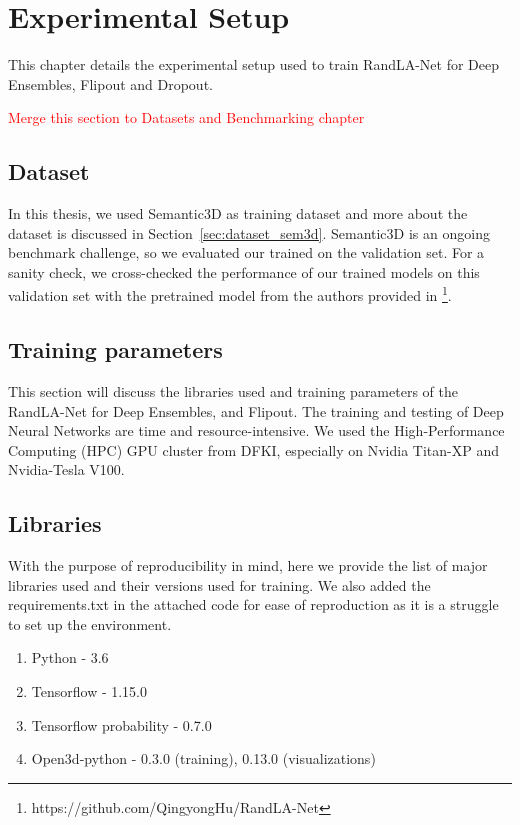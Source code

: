 

    \chapter{Experimental Setup}
    This chapter details the experimental setup used to train RandLA-Net for Deep Ensembles, Flipout and Dropout.


    \textcolor{red}{Merge this section to Datasets and Benchmarking chapter}
    \section{Dataset}
    In this thesis, we used Semantic3D as training dataset and more about the dataset is discussed in Section~\ref{sec:dataset_sem3d}.
    Semantic3D is an ongoing benchmark challenge, so we evaluated our trained on the validation set.
    For a sanity check, we cross-checked the performance of our trained models on this validation set with the pretrained model from the authors provided in \footnote[1]{https://github.com/QingyongHu/RandLA-Net}.

    \section{Training parameters}
    This section will discuss the libraries used and training parameters of the RandLA-Net for Deep Ensembles, and Flipout.    The training and testing of Deep Neural Networks are time and resource-intensive.
    We used the High-Performance Computing (HPC) GPU cluster from DFKI, especially on Nvidia Titan-XP and Nvidia-Tesla V100.
    \section{Libraries}
    With the purpose of reproducibility in mind, here we provide the list of major libraries used and their versions used for training.
    We also added the requirements.txt in the attached code for ease of reproduction as it is a struggle to set up the environment.
    \begin{enumerate}
        \item Python - 3.6
        \item Tensorflow - 1.15.0
        \item Tensorflow probability - 0.7.0
        \item Open3d-python - 0.3.0 (training), 0.13.0 (visualizations)
    \end{enumerate}
    
